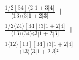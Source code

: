 \documentclass[varwidth, border=5pt]{standalone}
\begin{document}
\begin{my}
$\begin{gathered}
\scriptscriptstyle\frac{1/2[34]⟨2|1+3|4]}{⟨13⟩⟨3|1+2|3]} +\\
\scriptscriptstyle\frac{1/2⟨24⟩[34]⟨3|1+2|4]}{⟨13⟩⟨34⟩⟨3|1+2|3]} +\\
\scriptscriptstyle\frac{1⟨12⟩[13][34]⟨3|1+2|4]}{⟨13⟩⟨3|1+2|3]²} \phantom{+}
\end{gathered}$
\end{my}
\end{document}
